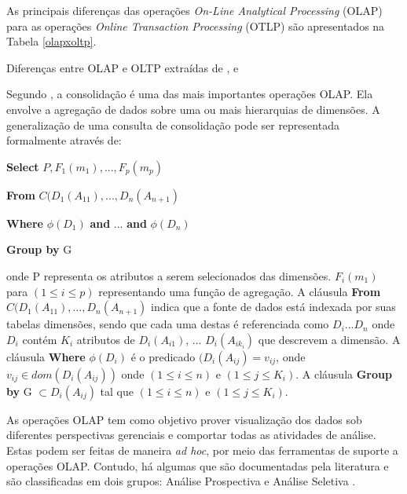 As principais diferenças das operações \textit{On-Line Analytical Processing} (OLAP) para as operações 
\textit{Online Transaction Processing} (OTLP) são apresentados na Tabela 
\ref{olapxoltp}.

	\begin{table}[!ht]
	\begin{center}

	
	
	\caption{Diferenças entre OLAP e OLTP extraídas de ,  e }
	\label{olapxoltp}
	\end{center}
	\end{table}
	\FloatBarrier

Segundo , a consolidação é uma das mais importantes operações OLAP. Ela envolve a agregação de dados sobre uma ou mais hierarquias de dimensões. A generalização de uma consulta de consolidação pode ser representada formalmente através de: 

\textbf{Select} $\displaystyle P,F_{1}(m_1),..., F_p(m_p)$

\textbf{From} $\displaystyle C(D_1(A_{11}),...,D_n(A_{n+1})$

\textbf{Where} $\displaystyle \phi(D_1)$ \textbf{and} ... \textbf{and}  $\displaystyle\phi(D_n)$

\textbf{Group by} G

onde P representa os atributos a serem selecionados das dimensões. $\displaystyle F_{i}(m_1)$ para $\displaystyle (1 \leq i \leq p) $ representando uma função de agregação. A cláusula \textbf{From} $\displaystyle C(D_1(A_{11}),...,D_n(A_{n+1})$ indica que a fonte de dados está indexada por suas tabelas dimensões, sendo que cada uma destas é referenciada como $\displaystyle D_i ... D_n $ onde  $\displaystyle D_i $ contém  $\displaystyle K_i$ atributos de  $\displaystyle D_i(A_{i1})$, ... $ \displaystyle D_i(A_{ik_{i}}) $ que descrevem a dimensão.  A cláusula \textbf{Where} $\displaystyle \phi(D_i)$ é o predicado $\displaystyle (D_i(A_{ij}) = v_{ij}$, onde $\displaystyle v_{ij} \in dom(D_i(A_{ij}))$ onde $\displaystyle (1 \leq i \leq n) $ e $\displaystyle (1 \leq j \leq K_{i}) $. A cláusula \textbf{Group by} G $\displaystyle \subset {D_{i}(A_{ij})} $ tal que $\displaystyle (1 \leq i \leq n) $ e $\displaystyle (1 \leq j \leq K_{i})$.


As operações OLAP tem como objetivo prover visualização dos dados sob diferentes perspectivas gerenciais e comportar todas as atividades de análise. Estas podem ser feitas de maneira \textit{ad hoc}, por meio das ferramentas de suporte a operações OLAP. Contudo, há algumas que são documentadas pela literatura e são classificadas em dois grupos: Análise Prospectiva e Análise Seletiva .


